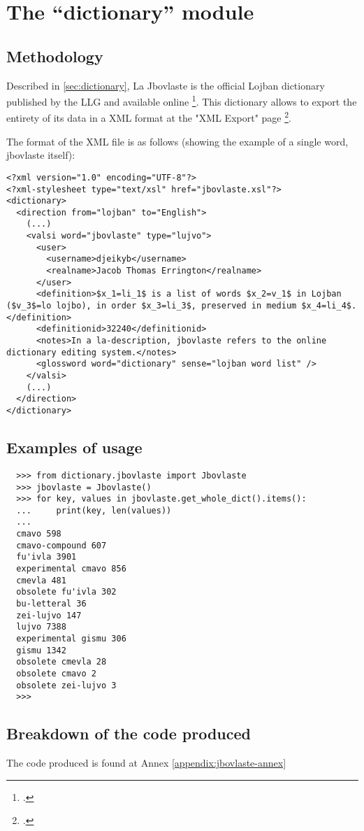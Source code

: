 \chapter{The ``dictionary'' module}
\label{chap:creating_a_dictionary}

\section{Methodology}

Described in \ref{sec:dictionary}, La Jbovlaste is the official Lojban dictionary published by the LLG and available online \footcite{jbovlaste}.
This dictionary allows to export the entirety of its data in a XML format at the "XML Export" page \footcite{jbovlaste-export}.\\

\newpage

The format of the XML file is as follows (showing the example of a single word, jbovlaste itself): \\

\begin{lstlisting}
<?xml version="1.0" encoding="UTF-8"?>
<?xml-stylesheet type="text/xsl" href="jbovlaste.xsl"?>
<dictionary>
  <direction from="lojban" to="English">
    (...)
    <valsi word="jbovlaste" type="lujvo">
      <user>
        <username>djeikyb</username>
        <realname>Jacob Thomas Errington</realname>
      </user>
      <definition>$x_1=li_1$ is a list of words $x_2=v_1$ in Lojban ($v_3$=lo lojbo), in order $x_3=li_3$, preserved in medium $x_4=li_4$.</definition>
      <definitionid>32240</definitionid>
      <notes>In a la-description, jbovlaste refers to the online dictionary editing system.</notes>
      <glossword word="dictionary" sense="lojban word list" />
    </valsi>
    (...)
  </direction>
</dictionary>
\end{lstlisting}

\section{Examples of usage}

\begin{lstlisting}
  >>> from dictionary.jbovlaste import Jbovlaste
  >>> jbovlaste = Jbovlaste()
  >>> for key, values in jbovlaste.get_whole_dict().items():
  ...     print(key, len(values))
  ...
  cmavo 598
  cmavo-compound 607
  fu'ivla 3901
  experimental cmavo 856
  cmevla 481
  obsolete fu'ivla 302
  bu-letteral 36
  zei-lujvo 147
  lujvo 7388
  experimental gismu 306
  gismu 1342
  obsolete cmevla 28
  obsolete cmavo 2
  obsolete zei-lujvo 3
  >>>
  \end{lstlisting}

\section{Breakdown of the code produced}

The code produced is found at Annex \ref{appendix:jbovlaste-annex}